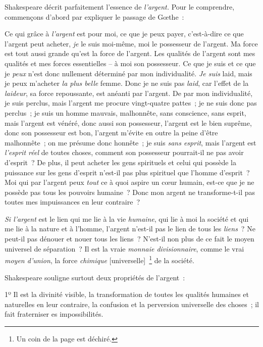 \documentclass[french,twoside]{book} %
\begin{document}
\noindent Shakespeare décrit parfaitement l’essence de \emph{l’argent.} Pour le comprendre, commençons d’abord par expliquer le passage de Gœthe :\par
Ce qui grâce à \emph{l’argent} est pour moi, ce que je peux payer, c’est-à-dire ce que l’argent peut acheter, \emph{je} le suis moi-même, moi le possesseur de l’argent. Ma force est tout aussi grande qu’est la force de l’argent. Les qualités de l’argent sont mes qualités et mes forces essentielles – à moi son possesseur. Ce que je suis et ce que je \emph{peux} n’est donc nullement déterminé par mon individualité. \emph{Je suis} laid, mais je peux m’acheter \emph{la plus belle} femme. Donc je ne suis pas \emph{laid}, car l’effet de la \emph{laideur}, sa force repoussante, est anéanti par l’argent. De par mon individualité, je suis perclus, mais l’argent me procure vingt-quatre pattes ; je ne suis donc pas perclus ; je suis un homme mauvais, malhonnête, sans conscience, sans esprit, mais l’argent est vénéré, donc aussi son possesseur, l’argent est le bien suprême, donc son possesseur est bon, l’argent m’évite en outre la peine d’être malhonnête ; on me présume donc honnête ; je suis \emph{sans esprit}, mais l’argent est \emph{l’esprit réel} de toutes choses, comment son possesseur pourrait-il ne pas avoir d’esprit ? De plus, il peut acheter les gens spirituels et celui qui possède la puissance sur les gens d’esprit n’est-il pas plus spirituel que l’homme d’esprit ? Moi qui par l’argent peux \emph{tout} ce à quoi aspire un cœur humain, est-ce que je ne possède pas tous les pouvoirs humaine ? Donc mon argent ne transforme-t-il pas toutes mes impuissances en leur contraire ?\par
\emph{Si l’argent} est le lien qui me lie à la vie \emph{humaine}, qui lie à moi la société et qui me lie à la nature et à l’homme, l’argent n’est-il pas le lien de tous les \emph{liens} ? Ne peut-il pas dénouer et nouer tous les liens ? N’est-il non plus de ce fait le moyen universel de séparation ? Il est la vraie \emph{monnaie divisionnaire}, comme le vrai \emph{moyen d’union}, la force \emph{chimique} [universelle] \footnote{Un coin de la page est déchiré.} de la société.\par
Shakespeare souligne surtout deux propriétés de l’argent :\par
1º Il est la divinité visible, la transformation de toutes les qualités humaines et naturelles en leur contraire, la confusion et la perversion universelle des choses ; il fait fraterniser es impossibilités.\par
\end{document}
